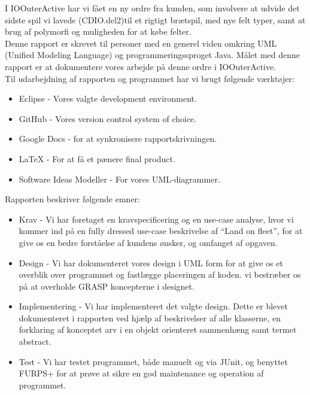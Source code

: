 I IOOuterActive har vi fået en ny ordre fra kunden, som involvere at udvide det
sidste spil vi lavede (CDIO.del2)til et rigtigt brætspil, med nye felt typer,
samt at brug af polymorfi og muligheden for at købe felter.\\
\indent Denne rapport er skrevet til personer med en generel viden omkring UML
(Unified Modeling Language) og programmeringssproget Java. Målet med denne
rapport er at dokumentere vores arbejde på denne ordre i IOOuterActive.\\
\indent Til udarbejdning af rapporten og programmet har vi brugt følgende
værktøjer:
\begin{itemize}
  \item Eclipse - Vores valgte development environment.
  \item GitHub - Vores version control system of choice.
  \item Google Docs - for at synkronisere rapportskrivningen.
  \item LaTeX - For at få et pænere final product.
  \item Software Ideas Modeller - For vores UML-diagrammer.
\end{itemize}
Rapporten beskriver følgende emner:
\begin{itemize}
  \item Krav - Vi har foretaget en kravspecificering og en use-case analyse,
  hvor vi kommer ind på en fully dressed use-case beskrivelse  af  “Land on fleet”,
  for at give os en bedre forståelse af kundens ønsker, og omfanget af
  opgaven.
  \item Design - Vi har dokumenteret vores design i UML form for at give os et
  overblik over programmet og fastlægge placeringen af koden. vi bestræber os på
  at overholde GRASP koncepterne i designet.
  \item Implementering - Vi har implementeret det valgte design. Dette er blevet
  dokumenteret i rapporten ved hjælp af beskrivelser af alle klasserne, en
  forklaring af konceptet arv i en objekt orienteret sammenhæng samt termet
  abstract.
  \item Test - Vi har testet programmet, både manuelt og via JUnit, og benyttet
  FURPS+ for at prøve at sikre en god maintenance og operation af programmet.
\end{itemize}